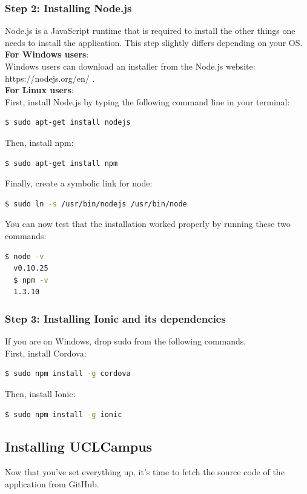 \documentclass{eplmastersthesis}
\begin{document}
\subsubsection{Step 2: Installing Node.js}

Node.js is a JavaScript runtime that is required to install the other things one needs to install the application. This step slightly differs depending on your OS.\\

\textbf{For Windows users}: \\
Windows users can download an installer from the Node.js website: https://nodejs.org/en/ .\\

\textbf{For Linux users}: \\
First, install Node.js by typing the following command line in your terminal:
\begin{lstlisting}[language=bash]
  $ sudo apt-get install nodejs
\end{lstlisting}
Then, install npm:
\begin{lstlisting}[language=bash]
  $ sudo apt-get install npm
\end{lstlisting}
Finally, create a symbolic link for node:
\begin{lstlisting}[language=bash]
  $ sudo ln -s /usr/bin/nodejs /usr/bin/node
\end{lstlisting}
You can now test that the installation worked properly by running these two commands:
\begin{lstlisting}[language=bash]
  $ node -v
  v0.10.25
  $ npm -v
  1.3.10
\end{lstlisting}
\subsubsection{Step 3: Installing Ionic and its dependencies}
If you are on Windows, drop sudo from the following commands.
\\First, install Cordova:
\begin{lstlisting}[language=bash]
   $ sudo npm install -g cordova
\end{lstlisting}
Then, install Ionic:
\begin{lstlisting}[language=bash]
   $ sudo npm install -g ionic
\end{lstlisting}
\subsection{Installing UCLCampus}
Now that you've set everything up, it's time to fetch the source code of the application from GitHub. 
\end{document}
